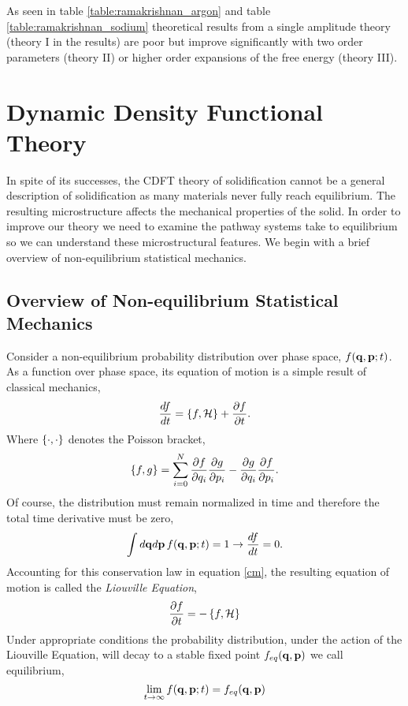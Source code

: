 As seen in table \ref{table:ramakrishnan_argon} and table
\ref{table:ramakrishnan_sodium} theoretical results from a single amplitude
theory (theory I in the results) are poor but improve significantly with two
order parameters (theory II) or higher order expansions of the free energy
(theory III).

\section{Dynamic Density Functional Theory} %

In spite of its successes, the CDFT theory of solidification cannot be a
general description of solidification as many materials never fully reach
equilibrium. The resulting microstructure affects the mechanical properties of
the solid. In order to improve our theory we need to examine the pathway
systems take to equilibrium so we can understand these microstructural
features. We begin with a brief overview of non-equilibrium statistical
mechanics.

\subsection{Overview of Non-equilibrium Statistical Mechanics} %

Consider a non-equilibrium probability distribution over phase space, $f(\mathbf{q},
\mathbf{p}; t)$. As a function over phase space, its equation of motion is a simple
result of classical mechanics,
%
\begin{equation}
    \label{cm} 
    \frac{d f}{dt} = \left\lbrace f, \mathcal{H} \right\rbrace + \frac{\partial f}{\partial t}.
\end{equation}
%
Where $\left\lbrace \cdot, \cdot \right\rbrace$ denotes the Poisson bracket,
%
\begin{equation}
    \left\lbrace f, g \right\rbrace = \sum_{i = 0}^N \frac{\partial f}{\partial q_i}
        \frac{\partial g}{\partial p_i} - \frac{\partial g}{\partial q_i}
        \frac{\partial f}{\partial p_i}.
\end{equation}
%
Of course, the distribution must remain normalized in time and therefore the 
total time derivative must be zero,
%
\begin{equation}
    \int d\mathbf{q} d\mathbf{p}\, f(\mathbf{q}, \mathbf{p}; t) = 1 \rightarrow \frac{d f}{dt} = 0.
\end{equation}
%
Accounting for this conservation law in equation \ref{cm}, the resulting
equation of motion is called the \textit{Liouville Equation},
%
\begin{equation}
    \label{liouville} 
    \frac{\partial f}{\partial t} = - \left\lbrace f , \mathcal{H} \right\rbrace
\end{equation}
%
Under appropriate conditions the probability distribution, under the action of
the Liouville Equation, will decay to a stable fixed point $f_{eq}(\mathbf{q}, \mathbf{p})$ we
call equilibrium,
%
\begin{equation}
    \lim_{t \rightarrow \infty} f(\mathbf{q}, \mathbf{p}; t) = f_{eq}(\mathbf{q}, \mathbf{p})
\end{equation}
%

